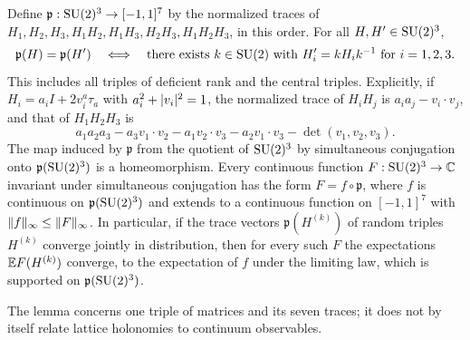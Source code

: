 \begin{lemma}\label{ch02:lem:seven-traces}
Define $\mathfrak p:\mathrm{SU}(2)^3\to[-1,1]^7$ by the normalized traces of $H_1,H_2,H_3,H_1H_2,H_1H_3,H_2H_3,H_1H_2H_3$, in this order. For all $H,H'\in\mathrm{SU}(2)^3$,
\[
 \mathfrak p(H)=\mathfrak p(H')\quad\Longleftrightarrow\quad\text{there exists }k\in\mathrm{SU}(2)\text{ with }H_i'=kH_ik^{-1}\text{ for }i=1,2,3.
\]
This includes all triples of deficient rank and the central triples. Explicitly, if $H_i=a_iI+2v_i^a\tau_a$ with $a_i^2+\lvert v_i\rvert^2=1$, the normalized trace of $H_iH_j$ is $a_ia_j-v_i\cdot v_j$, and that of $H_1H_2H_3$ is
\[
 a_1a_2a_3-a_3v_1\cdot v_2-a_1v_2\cdot v_3-a_2v_1\cdot v_3-\det(v_1,v_2,v_3).
\]
The map induced by $\mathfrak p$ from the quotient of $\mathrm{SU}(2)^3$ by simultaneous conjugation onto $\mathfrak p(\mathrm{SU}(2)^3)$ is a homeomorphism. Every continuous function $F:\mathrm{SU}(2)^3\to\mathbb C$ invariant under simultaneous conjugation has the form $F=f\circ\mathfrak p$, where $f$ is continuous on $\mathfrak p(\mathrm{SU}(2)^3)$ and extends to a continuous function on $[-1,1]^7$ with $\lVert f\rVert_\infty\le\lVert F\rVert_\infty$. In particular, if the trace vectors $\mathfrak p(H^{(k)})$ of random triples $H^{(k)}$ converge jointly in distribution, then for every such $F$ the expectations $\mathbb E F(H^{(k)})$ converge, to the expectation of $f$ under the limiting law, which is supported on $\mathfrak p(\mathrm{SU}(2)^3)$.
\end{lemma}

The lemma concerns one triple of matrices and its seven traces; it does not by itself relate lattice holonomies to continuum observables.

